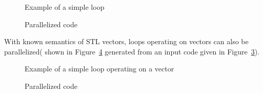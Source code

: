 \lstset{language=C,basicstyle=\scriptsize,numbers=left}
\begin{figure}[htbp]
{\indent
  {\mySmallFontSize
    \begin{latexonly}
    
    \end{latexonly}
    \begin{htmlonly}
    
    \end{htmlonly}
  }
}
\caption{Example of a simple loop}
\label{Manual:autopar:reduction}
\end{figure}

\begin{figure}[htbp]
{\indent
  {\mySmallFontSize
    \begin{latexonly}
    
    \end{latexonly}
    \begin{htmlonly}
    
    \end{htmlonly}
  }
}
\caption{Parallelized code}
\label{Manual:autopar:reduction-trans}
\end{figure}

With known semantics of STL vectors, loops operating on vectors can also be parallelized( shown in Figure~\ref{Manual:autopar:doall_vector2-trans} generated from  an input code given in Figure~\ref{Manual:autopar:doall_vector2}).

\lstset{language=C,basicstyle=\scriptsize,numbers=left}
\begin{figure}[htbp]
{\indent
  {\mySmallFontSize
    \begin{latexonly}
    
    \end{latexonly}
    \begin{htmlonly}
    
    \end{htmlonly}
  }
}
\caption{Example of a simple loop operating on a vector}
\label{Manual:autopar:doall_vector2}
\end{figure}

\begin{figure}[htbp]
{\indent
  {\mySmallFontSize
    \begin{latexonly}
    
    \end{latexonly}
    \begin{htmlonly}
    
    \end{htmlonly}
  }
}
\caption{Parallelized code}
\label{Manual:autopar:doall_vector2-trans}
\end{figure}



